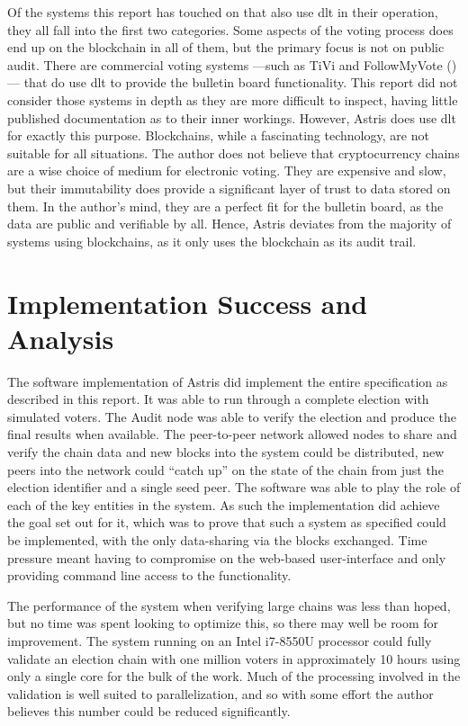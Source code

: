 Of the systems this report has touched on that also use \gls{dlt} in their operation, they all fall into the first two categories. Some aspects of the voting process does end up on the blockchain in all of them, but the primary focus is not on public audit. There are commercial voting systems ---such as TiVi \cite{smartmaticTIVIWhitepaper} and FollowMyVote ()--- that do use \gls{dlt} to provide the bulletin board functionality. This report did not consider those systems in depth as they are more difficult to inspect, having little published documentation as to their inner workings. However, Astris does use \gls{dlt} for exactly this purpose. Blockchains, while a fascinating technology, are not suitable for all situations. The author does not believe that cryptocurrency chains are a wise choice of medium for electronic voting. They are expensive and slow, but their immutability does provide a significant layer of trust to data stored on them. In the author's mind, they are a perfect fit for the bulletin board, as the data are public and verifiable by all. Hence, Astris deviates from the majority of systems using blockchains, as it only uses the blockchain as its audit trail.

\section{Implementation Success and Analysis}
\label{ch:analysis:impl}

The software implementation of Astris did implement the entire specification as described in this report. It was able to run through a complete election with simulated voters. The Audit node was able to verify the election and produce the final results when available. The peer-to-peer network allowed nodes to share and verify the chain data and new blocks into the system could be distributed, new peers into the network could ``catch up'' on the state of the chain from just the election identifier and a single seed peer. The software was able to play the role of each of the key entities in the system. As such the implementation did achieve the goal set out for it, which was to prove that such a system as specified could be implemented, with the only data-sharing via the blocks exchanged. Time pressure meant having to compromise on the web-based user-interface and only providing command line access to the functionality.

The performance of the system when verifying large chains was less than hoped, but no time was spent looking to optimize this, so there may well be room for improvement. The system running on an Intel i7-8550U processor could fully validate an election chain with one million voters in approximately 10 hours using only a single core for the bulk of the work. Much of the processing involved in the validation is well suited to parallelization, and so with some effort the author believes this number could be reduced significantly.

